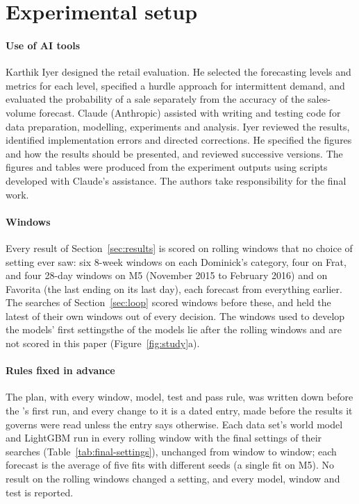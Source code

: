 \section{Experimental setup}
\label{sec:setup}

\ifjof
\paragraph{Use of AI tools}
Karthik Iyer designed the retail evaluation. He selected the forecasting levels and metrics for each level, specified a
hurdle approach for intermittent demand, and evaluated the probability of a sale separately from the accuracy of the
sales-volume forecast. Claude (Anthropic) assisted with writing and testing code for data preparation, modelling,
experiments and analysis. Iyer reviewed the results, identified implementation errors and directed corrections. He
specified the figures and how the results should be presented, and reviewed successive versions. The figures and
tables were produced from the experiment outputs using scripts developed with Claude's assistance. The authors take
responsibility for the final work.

\fi
\paragraph{Windows}
Every result of Section~\ref{sec:results} is scored on rolling windows that no
choice of setting ever saw: six 8-week windows on each Dominick's category, four
on Frat, and four 28-day windows on M5 (November 2015 to February 2016) and on
Favorita (the last ending on its last day), each forecast from everything
earlier. The searches of Section~\ref{sec:loop} scored windows before these,
and held the latest of their own windows out of every decision. The windows used
to develop \ifjournal the models' first settings\else the \firstver{} of the models\fi{} lie after the rolling windows and are
not scored in this paper (Figure~\ref{fig:study}a).

\paragraph{Rules fixed in advance}
The \revn{} plan, with every window, model, test and pass rule, was written down
before the \revn{}'s first run, and every change to it is a dated entry,
made before the results it governs were read unless the entry says otherwise.
Each data set's world model and LightGBM run in every rolling window with the
final settings of their searches (Table~\ref{tab:final-settings}), unchanged
from window to window; each forecast is the average of five fits with different
seeds (a single fit on M5). No result on the rolling windows changed a
setting, and every model, window and test is reported.

